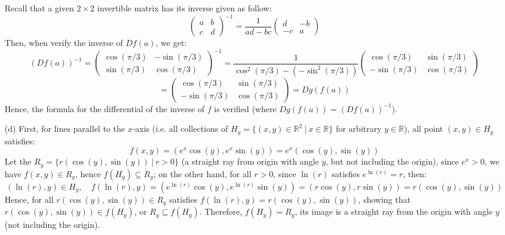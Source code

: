 \documentclass{article}
\begin{document}
\begin{itemize}
    Recall that a given $2\times 2$ invertible matrix has its inverse given as follow:
    $$\begin{pmatrix}
        a&b\\c&d
    \end{pmatrix}^{-1} = \frac{1}{ad-bc}\begin{pmatrix}
        d&-b\\-c&a
    \end{pmatrix}$$
    Then, when verify the inverse of $Df(a)$, we get:
    $$(Df(a))^{-1} = \begin{pmatrix}
        \cos(\pi/3)&-\sin(\pi/3)\\
        \sin(\pi/3)&\cos(\pi/3)
    \end{pmatrix}^{-1} = \frac{1}{\cos^2(\pi/3) - (-\sin^2(\pi/3))}\begin{pmatrix}
        \cos(\pi/3)&\sin(\pi/3)\\
        -\sin(\pi/3)&\cos(\pi/3)
    \end{pmatrix}$$
    $$ = \begin{pmatrix}
        \cos(\pi/3)&\sin(\pi/3)\\
        -\sin(\pi/3)&\cos(\pi/3)
    \end{pmatrix} = Dg(f(a))$$
    Hence, the formula for the differential of the inverse of $f$ is verified (where $Dg(f(a)) = (Df(a))^{-1}$).

    \hfil

    \item[(d)] First, for lines parallel to the $x$-axis (i.e. all collections of $H_y = \{(x,y)\in\mathbb{R}^2\ |\ x\in\mathbb{R}\}$ for arbitrary $y\in\mathbb{R}$), all point $(x,y)\in H_y$ satisfies:
    $$f(x,y) = (e^x\cos(y),e^x\sin(y)) = e^x(\cos(y),\sin(y))$$
    Let the $R_y = \{r(\cos(y),\sin(y))\ |\ r>0\}$ (a straight ray from origin with angle $y$, but not including the origin), since $e^x>0$, we have $f(x,y)\in R_y$, hence $f(H_y)\subseteq R_y$;
    on the other hand, for all $r>0$, since $\ln(r)$ satisfies $e^{\ln(r)}=r$, then:
    $$(\ln(r),y)\in H_y,\quad f(\ln(r),y) = (e^{\ln(r)}\cos(y),e^{\ln(r)}\sin(y)) = (r\cos(y),r\sin(y))=r(\cos(y),\sin(y))$$
    Hence, for all $r(\cos(y),\sin(y))\in R_y$ satisfies $f(\ln(r),y)=r(\cos(y),\sin(y))$, showing that $r(\cos(y),\sin(y))\in f(H_y)$, or $R_y\subseteq f(H_y)$.
    Therefore, $f(H_y)=R_y$, its image is a straight ray from the origin with angle $y$ (not including the origin).


\end{itemize}
\end{document}
